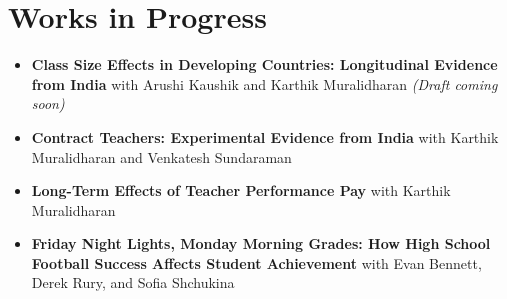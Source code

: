 \documentclass[letter,11pt]{article}
\begin{document}
\section{Works in Progress}
\begin{itemize}
        \item[] \textbf{Class Size Effects in Developing Countries: Longitudinal Evidence from India} {\small{with Arushi Kaushik and Karthik Muralidharan} \textit{(Draft coming soon)}} 
        \item[] \textbf{Contract Teachers: Experimental Evidence from India} {\small{with Karthik Muralidharan and Venkatesh Sundaraman}}
        \item[] \textbf{Long-Term Effects of Teacher Performance Pay} {\small{with Karthik Muralidharan}}
        \item[] \textbf{Friday Night Lights, Monday Morning Grades: How High School Football Success Affects Student Achievement} {\small{with Evan Bennett, Derek Rury, and Sofia Shchukina}}
\end{itemize}
\end{document}
